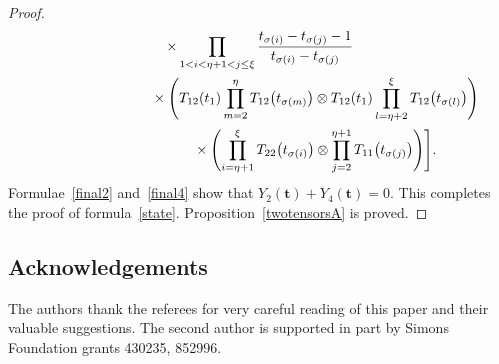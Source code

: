 \documentclass[pdftex]{sigma}
\numberwithin{equation}{section}
\begin{document}
\begin{proof}
\begin{gather}
 \times\prod_{1< i<\eta+1<j \leq \xi} \frac{t_{\sigma(i)}-t_{\sigma(j)}-1}{t_{\sigma(i)}-t_{\sigma(j)}} \nonumber\\
 \hphantom{Y_4(\boldsymbol{t})=\times\sum_{\sigma\in S_{\xi-1}'} \Biggl[}{}
\times\Biggl(T_{12}(t_1) \prod_{m=2}^{\eta} T_{12} \bigl(t_{\sigma(m)}\bigr) \otimes T_{12}(t_1) \prod_{l=\eta+2}^{\xi } T_{12} \bigl(t_{\sigma(l)}\bigr) \Biggr)\nonumber \\
 \hphantom{Y_4(\boldsymbol{t})=\times\sum_{\sigma\in S_{\xi-1}'} \Biggl[}{}
\times\Biggl( \prod_{i=\eta+1}^{\xi } T _{22}\bigl(t_{\sigma(i)}\bigr)\otimes \prod_{j=2}^{\eta+1} T _{11}\bigl(t_{\sigma(j)}\bigr)\Biggr) \Biggr].\label{final4}
\end{gather}
Formulae~\eqref{final2} and~\eqref{final4} show that $Y_2(\boldsymbol{t})+Y_4(\boldsymbol{t})=0$. This completes the proof of formula~\eqref{state}. Proposition~\ref{twotensorsA} is proved.
\end{proof}

\subsection*{Acknowledgements}
The authors thank the referees for very careful reading of this paper and their valuable
suggestions. The second author is supported in part by Simons Foundation grants 430235, 852996.
\end{document}
